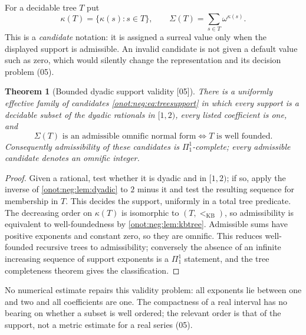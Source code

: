 \documentclass[11pt,oneside]{article}
\numberwithin{equation}{section}
\newtheorem{theorem}{Theorem}[section]
\theoremstyle{definition}
\theoremstyle{remark}
\newcommand{\kb}{<_{\mathrm{KB}}}
\newcommand{\src}[1]{\textup{\textsf{\small[#1]}}}
\begin{document}
For a decidable tree $T$ put
\begin{equation}\label{onot:neg:eq:treesupport}
 \kappa(T)=\{\kappa(s):s\in T\},\qquad \Sigma(T)=\sum_{s\in T}\omega^{\kappa(s)}.
\end{equation}
This is a \emph{candidate} notation: it is assigned a surreal value only when the
displayed support is admissible. An invalid candidate is not given a default value
such as zero, which would silently change the representation and its decision
problem (05).

\begin{theorem}[Bounded dyadic support validity \src{05}]\label{onot:neg:thm:pionesone}
There is a uniformly effective family of candidates \eqref{onot:neg:eq:treesupport}
in which every support is a decidable subset of the dyadic rationals in $[1,2)$,
every listed coefficient is one, and
\[
 \Sigma(T)\text{ is an admissible omnific normal form}\iff T\text{ is well founded}.
\]
Consequently admissibility of these candidates is $\Pi^1_1$-complete; every
admissible candidate denotes an omnific integer.
\end{theorem}
\begin{proof}
Given a rational, test whether it is dyadic and in $[1,2)$; if so, apply the
inverse of \cref{onot:neg:lem:dyadic} to $2$ minus it and test the resulting
sequence for membership in $T$. This decides the support, uniformly in a total
tree predicate. The decreasing order on $\kappa(T)$ is isomorphic to $(T,\kb)$, so
admissibility is equivalent to well-foundedness by \cref{onot:neg:lem:kbtree}.
Admissible sums have positive exponents and constant zero, so they are omnific.
This reduces well-founded recursive trees to admissibility; conversely the absence
of an infinite increasing sequence of support exponents is a $\Pi^1_1$ statement,
and the tree completeness theorem gives the classification.
\end{proof}

No numerical estimate repairs this validity problem: all exponents lie between one
and two and all coefficients are one. The compactness of a real interval has no
bearing on whether a subset is well ordered; the relevant order is that of the
support, not a metric estimate for a real series (05).
\end{document}
